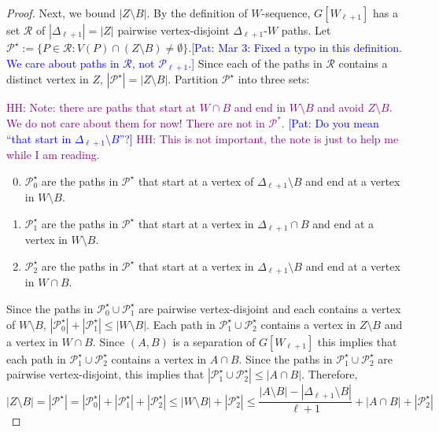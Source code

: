 \documentclass{patmorin}
\newcommand{\pat}[1]{\textcolor{Blue}{[Pat: #1]}}
\newcommand{\hussein}[1]{\textcolor{purple}{HH: #1}}
\begin{document}
\begin{proof}
Next, we bound $|Z\setminus B|$.  By the definition of $W$-sequence, $G[W_{\ell+1}]$ has a set $\mathcal{R}$ of $|\Delta_{\ell+1}|=|Z|$ pairwise vertex-disjoint $\Delta_{\ell+1}$-$W$ paths.  Let $\mathcal{P}^\star:=\{P\in\mathcal{R}: V(P)\cap (Z\setminus B)\neq\emptyset\}$.\pat{Mar 3: Fixed a typo in this definition. We care about paths in $\mathcal{R}$, not $\mathcal{P}_{\ell+1}$.} Since each of the paths in $\mathcal{R}$ contains a distinct vertex in $Z$, $|\mathcal{P}^\star|=|Z\setminus B|$.  Partition $\mathcal{P}^\star$ into three sets:

\hussein{Note: there are paths that start at $W\cap B$ and end in $W\setminus B$ and avoid $Z\setminus B$. We do not care about them for now! There are not in $\mathcal{P}^*$.} \pat{Do you mean ``that start in $\Delta_{\ell+1}\setminus B$''?}
\hussein{This is not important, the note is just to help me while I am reading. }
  \begin{enumerate}\setcounter{enumi}{-1}
      \item $\mathcal{P}^\star_0$ are the paths in $\mathcal{P}^\star$ that start at a vertex of $\Delta_{\ell+1}\setminus B$ and end at a vertex in $W\setminus B$.
      \item $\mathcal{P}^\star_1$ are the paths in $\mathcal{P}^\star$ that start at a vertex in $\Delta_{\ell+1}\cap B$ and end at a vertex in $W\setminus B$.
      \item $\mathcal{P}^\star_2$ are the paths in $\mathcal{P}^\star$ that start at a vertex in $\Delta_{\ell+1}\setminus B$ and end at a vertex in $W\cap B$.
  \end{enumerate}
  Since the paths in $\mathcal{P}_0^\star\cup\mathcal{P}_1^\star$ are pairwise vertex-disjoint and each contains a vertex of $W\setminus B$, $|\mathcal{P}_0^\star|+|\mathcal{P}_1^\star|\le|W\setminus B|$.
  Each path in $\mathcal{P}_1^\star\cup \mathcal{P}_2^\star$ contains a vertex in $Z\setminus B$ and a vertex in $W\cap B$.  Since $(A,B)$ is a separation of $G[W_{\ell+1}]$ this implies that each path in $\mathcal{P}_1^\star\cup \mathcal{P}_2^\star$ contains a vertex in $A\cap B$. Since the paths in  $\mathcal{P}_1^\star\cup \mathcal{P}_2^\star$ are pairwise vertex-disjoint, this implies that $|\mathcal{P}_1^\star\cup \mathcal{P}_2^\star|\le |A\cap B|$. Therefore,
  \begin{equation}
     |Z\setminus B| = |\mathcal{P}^\star| = |\mathcal{P}_0^{\star}| + |\mathcal{P}_1^\star| + |\mathcal{P}_2^{\star}|
     \le |W\setminus B| + |\mathcal{P}_2^\star|
     \le \frac{|A\setminus B|-|\Delta_{\ell+1}\setminus B|}{\ell+1}+|A\cap B|+|\mathcal{P}_2^\star|

\end{equation}
\end{proof}
\end{document}
